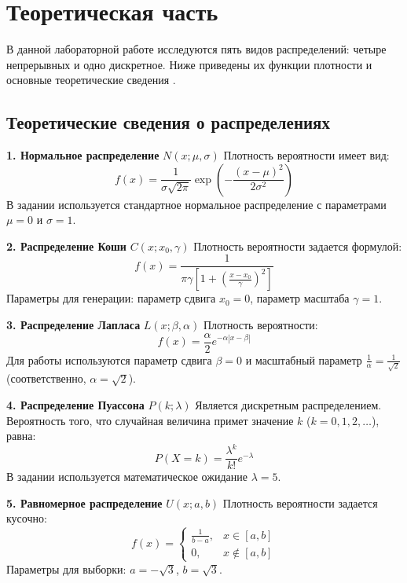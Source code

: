 \documentclass[a4paper, 14pt]{extarticle}
\begin{document}
\section{Теоретическая часть}

В данной лабораторной работе исследуются пять видов распределений: четыре непрерывных и одно дискретное. Ниже приведены их функции плотности и основные теоретические сведения \cite{babakhina, maksimov}.
\subsection{Теоретические сведения о распределениях}

\textbf{1. Нормальное распределение} $N(x; \mu, \sigma)$
Плотность вероятности имеет вид:
\begin{equation*}
    f(x) = \frac{1}{\sigma\sqrt{2\pi}} \exp\left(-\frac{(x-\mu)^2}{2\sigma^2}\right)
\end{equation*}
В задании используется стандартное нормальное распределение с параметрами $\mu = 0$ и $\sigma = 1$.

\textbf{2. Распределение Коши} $C(x; x_0, \gamma)$
Плотность вероятности задается формулой:
\begin{equation*}
    f(x) = \frac{1}{\pi\gamma \left[1 + \left(\frac{x-x_0}{\gamma}\right)^2\right]}
\end{equation*}
Параметры для генерации: параметр сдвига $x_0 = 0$, параметр масштаба $\gamma = 1$.

\textbf{3. Распределение Лапласа} $L(x; \beta, \alpha)$
Плотность вероятности:
\begin{equation*}
    f(x) = \frac{\alpha}{2} e^{-\alpha|x-\beta|}
\end{equation*}
Для работы используются параметр сдвига $\beta = 0$ и масштабный параметр $\frac{1}{\alpha} = \frac{1}{\sqrt{2}}$ (соответственно, $\alpha = \sqrt{2}$).

\textbf{4. Распределение Пуассона} $P(k; \lambda)$
Является дискретным распределением. Вероятность того, что случайная величина примет значение $k$ ($k = 0, 1, 2, \dots$), равна:
\begin{equation*}
    P(X = k) = \frac{\lambda^k}{k!}e^{-\lambda}
\end{equation*}
В задании используется математическое ожидание $\lambda = 5$.

\textbf{5. Равномерное распределение} $U(x; a, b)$
Плотность вероятности задается кусочно:
\begin{equation*}
    f(x) =
    \begin{cases}
        \frac{1}{b-a}, & x \in [a, b] \\
        0, & x \notin [a, b]
    \end{cases}
\end{equation*}
Параметры для выборки: $a = -\sqrt{3}$, $b = \sqrt{3}$.
\end{document}
